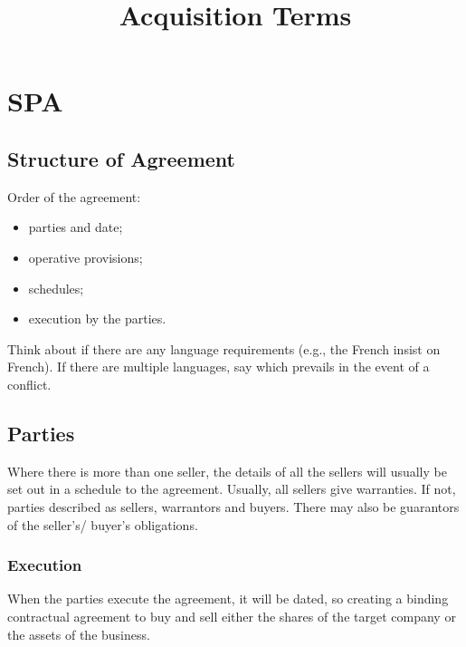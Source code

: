 \documentclass[
]{article}
\title{Acquisition Terms}
\author{}
\date{}
\providecommand{\tightlist}{%
  \setlength{\itemsep}{0pt}\setlength{\parskip}{0pt}}
\begin{document}
\maketitle

{
\setcounter{tocdepth}{3}
\tableofcontents
}
\hypertarget{spa}{%
\section{SPA}\label{spa}}

\hypertarget{structure-of-agreement}{%
\subsection{Structure of Agreement}\label{structure-of-agreement}}

Order of the agreement:

\begin{itemize}
\tightlist
\item
  parties and date;
\item
  operative provisions;
\item
  schedules;
\item
  execution by the parties.
\end{itemize}

Think about if there are any language requirements (e.g., the French
insist on French). If there are multiple languages, say which prevails
in the event of a conflict.

\hypertarget{parties}{%
\subsection{Parties}\label{parties}}

Where there is more than one seller, the details of all the sellers will
usually be set out in a schedule to the agreement. Usually, all sellers
give warranties. If not, parties described as sellers, warrantors and
buyers. There may also be guarantors of the seller's/ buyer's
obligations.

\hypertarget{execution}{%
\subsubsection{Execution}\label{execution}}

When the parties execute the agreement, it will be dated, so creating a
binding contractual agreement to buy and sell either the shares of the
target company or the assets of the business.
\end{document}

